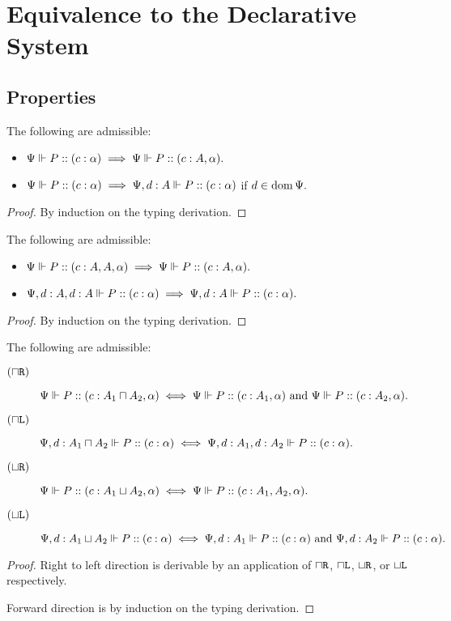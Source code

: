 
\section{Equivalence to the Declarative System}

\subsection{Properties}

\begin{lemma}[Weakening]
  The following are admissible:
  \begin{itemize}
    \item $\Psi \Vdash P :: (c : \alpha) \implies \Psi \Vdash P :: (c : A, \alpha).$
    \item $\Psi \Vdash P :: (c : \alpha) \implies \Psi, d : A \Vdash P :: (c : \alpha)$ if $d \in \operatorname{dom} \Psi.$
  \end{itemize}
\end{lemma}
\begin{proof}
  By induction on the typing derivation.
\end{proof}

\begin{lemma}[Contraction]
  The following are admissible:
  \begin{itemize}
    \item $\Psi \Vdash P :: (c : A, A, \alpha) \implies \Psi \Vdash P :: (c : A, \alpha).$
    \item $\Psi, d : A, d : A \Vdash P :: (c : \alpha) \implies \Psi, d : A \Vdash P :: (c : \alpha).$
  \end{itemize}
\end{lemma}
\begin{proof}
  By induction on the typing derivation.
\end{proof}

\begin{lemma}[Invertibility]
  The following are admissible:
  \begin{description}
    \item[$(\mathbin{\sqcap}\texttt{R})$] $\Psi \Vdash P :: (c : A_1 \mathbin{\sqcap} A_2, \alpha) \iff \Psi \Vdash P :: (c : A_1, \alpha) \text{ and } \Psi \Vdash P :: (c : A_2, \alpha).$
    \item[$(\mathbin{\sqcap}\texttt{L})$] $\Psi, d : A_1 \mathbin{\sqcap} A_2 \Vdash P :: (c : \alpha) \iff
    \Psi, d : A_1, d : A_2 \Vdash P :: (c : \alpha).$
    \item[$(\mathbin{\sqcup}\texttt{R})$] $\Psi \Vdash P :: (c : A_1 \mathbin{\sqcup} A_2, \alpha) \iff \Psi \Vdash P :: (c : A_1, A_2, \alpha).$
    \item[$(\mathbin{\sqcup}\texttt{L})$] $\Psi, d : A_1 \mathbin{\sqcup} A_2 \Vdash P :: (c : \alpha) \iff
    \Psi, d : A_1 \Vdash P :: (c : \alpha)
    \text{ and } \Psi, d : A_2 \Vdash P :: (c : \alpha).$
  \end{description}
\end{lemma}
\begin{proof}
  Right to left direction is derivable by an application of $\mathbin{\sqcap}\texttt{R}$, $\mathbin{\sqcap}\texttt{L}$, $\mathbin{\sqcup}\texttt{R}$, or $\mathbin{\sqcup}\texttt{L}$ respectively.

  Forward direction is by induction on the typing derivation.
\end{proof}

